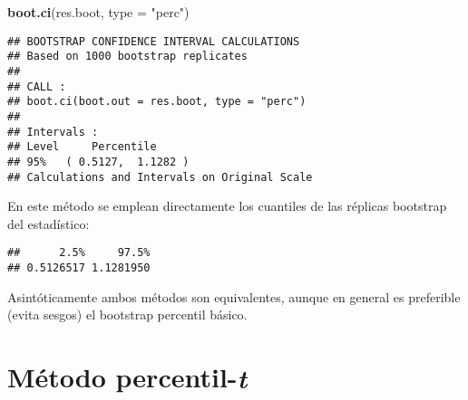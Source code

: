\documentclass[]{book}
\newenvironment{Shaded}{\begin{snugshade}}{\end{snugshade}}
\newcommand{\KeywordTok}[1]{\textcolor[rgb]{0.13,0.29,0.53}{\textbf{#1}}}
\newcommand{\DataTypeTok}[1]{\textcolor[rgb]{0.13,0.29,0.53}{#1}}
\newcommand{\DecValTok}[1]{\textcolor[rgb]{0.00,0.00,0.81}{#1}}
\newcommand{\StringTok}[1]{\textcolor[rgb]{0.31,0.60,0.02}{#1}}
\newcommand{\CommentTok}[1]{\textcolor[rgb]{0.56,0.35,0.01}{\textit{#1}}}
\newcommand{\OperatorTok}[1]{\textcolor[rgb]{0.81,0.36,0.00}{\textbf{#1}}}
\newcommand{\NormalTok}[1]{#1}
\theoremstyle{break}
\theoremstyle{definition}
\theoremstyle{definition}
\theoremstyle{definition}
\theoremstyle{remark}
\begin{document}
\begin{Shaded}
\begin{Highlighting}[]
\KeywordTok{boot.ci}\NormalTok{(res.boot, }\DataTypeTok{type =} \StringTok{"perc"}\NormalTok{)}
\end{Highlighting}
\end{Shaded}

\begin{verbatim}
## BOOTSTRAP CONFIDENCE INTERVAL CALCULATIONS
## Based on 1000 bootstrap replicates
## 
## CALL : 
## boot.ci(boot.out = res.boot, type = "perc")
## 
## Intervals : 
## Level     Percentile     
## 95%   ( 0.5127,  1.1282 )  
## Calculations and Intervals on Original Scale
\end{verbatim}

En este método se emplean directamente los cuantiles de las réplicas
bootstrap del estadístico:

\begin{Shaded}
\end{Shaded}

\begin{verbatim}
##      2.5%     97.5% 
## 0.5126517 1.1281950
\end{verbatim}

Asintóticamente ambos métodos son equivalentes, aunque en general es
preferible (evita sesgos) el bootstrap percentil básico.

\section{\texorpdfstring{Método
percentil-\emph{t}}{Método percentil-t}}\label{icboot-perc-t}
\end{document}
